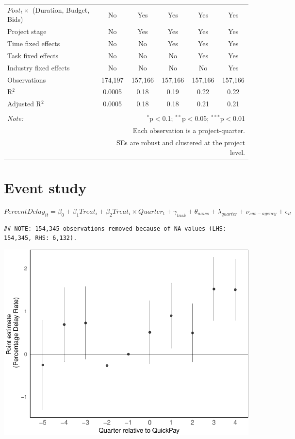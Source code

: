 \documentclass[
]{article}
\begin{document}
\begin{table}[H]
\begin{tabular}{@{\extracolsep{-2pt}}lccccc}
$Post_t \times$  (Duration, Budget, Bids) & No & Yes & Yes & Yes & Yes \\ 
Project stage & No & Yes & Yes & Yes & Yes \\ 
Time fixed effects & No & No & Yes & Yes & Yes \\ 
Task fixed effects & No & No & No & Yes & Yes \\ 
Industry fixed effects & No & No & No & No & Yes \\ 
Observations & 174,197 & 157,166 & 157,166 & 157,166 & 157,166 \\ 
R$^{2}$ & 0.0005 & 0.18 & 0.19 & 0.22 & 0.22 \\ 
Adjusted R$^{2}$ & 0.0005 & 0.18 & 0.18 & 0.21 & 0.21 \\ 
\hline 
\hline \\[-1.8ex] 
\textit{Note:}  & \multicolumn{5}{r}{$^{*}$p$<$0.1; $^{**}$p$<$0.05; $^{***}$p$<$0.01} \\ 
 & \multicolumn{5}{r}{Each observation is a project-quarter.} \\ 
 & \multicolumn{5}{r}{SEs are robust and clustered at the project level.} \\ 
\end{tabular} 
\end{table}

\hypertarget{event-study}{%
\section{Event study}\label{event-study}}

\(PercentDelay_{it}=\beta_0 + \beta_1 Treat_i + \beta_2 Treat_i \times Quarter_t + \gamma_{task} + \theta_{naics}+\lambda_{quarter}+\nu_{sub-agency}+\epsilon_{it}\)

\begin{verbatim}
## NOTE: 154,345 observations removed because of NA values (LHS: 154,345, RHS: 6,132).
\end{verbatim}

\includegraphics{qp_first_pc_delay_one_type_files/figure-latex/event_study-1.pdf}
\end{document}
